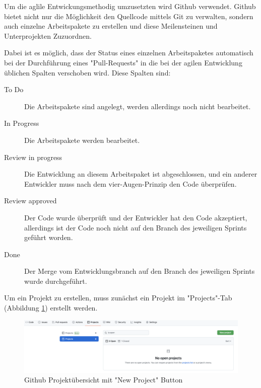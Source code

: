 \label{sec:github}

Um die aglile Entwickungsmethodig umzusetzten wird Github verwendet. 
Github bietet nicht nur die Möglichkeit den Quellcode mittels Git zu verwalten, sondern auch einzelne Arbeitspakete zu erstellen und diese Meilensteinen und Unterprojekten Zuzuordnen.

Dabei ist es möglich, dass der Status eines einzelnen Arbeitspaketes automatisch bei der Durchführung eines "Pull-Requests" in die bei der agilen Entwicklung üblichen Spalten verschoben wird. Diese Spalten sind:

\begin{description}
    \item[To Do] Die Arbeitspakete sind angelegt, werden allerdings noch nicht bearbeitet.
    \item[In Progress] Die Arbeitspakete werden bearbeitet.
    \item[Review in progress] Die Entwicklung an diesem Arbeitspaket ist abgeschlossen, und ein anderer Entwickler muss nach dem vier-Augen-Prinzip den Code überprüfen. 
    \item[Review approved] Der Code wurde überprüft und der Entwickler hat den Code akzeptiert, allerdings ist der Code noch nicht auf den Branch des jeweiligen Sprints geführt worden.
    \item[Done] Der Merge vom Entwicklungsbranch auf den Branch des jeweiligen Sprints wurde durchgeführt.
\end{description}



Um ein Projekt zu erstellen, muss zunächst ein Projekt im "Projects"-Tab (Abbildung \ref{fig:newProject}) erstellt werden.

\begin{figure}[H]
    \centering
    \includegraphics[width=\textwidth]{media/ProjectManagement/CreateProject.png}
    \caption{Github Projektübersicht mit "New Project" Button}
    \label{fig:newProject}
\end{figure}

